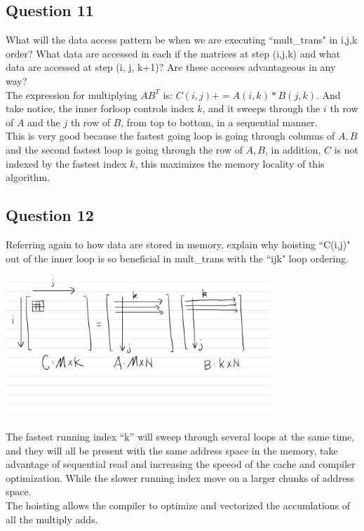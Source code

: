\documentclass[]{article}
\begin{document}
\subsection*{Question 11}
    What will the data access pattern be when we are executing ``mult\_trans" in i,j,k order?  What data are accessed in each if the matrices at step (i,j,k) and what data are accessed at step (i, j, k+1)? Are these accesses advantageous in any way?
    \\[1.1em]
    The expression for multiplying $AB^T$ is: $C(i, j) \mathrel{{+}{=}} A(i, k) * B(j, k)$. And take notice, the inner forloop controls index $k$, and it sweeps through the $i$ th row of $A$ and the $j$ th row of $B$, from top to bottom, in a sequential manner. 
    \\[1.1em]
    This is very good because the fastest going loop is going through columns of $A,B$ and the second fastest loop is going through the row of $A, B$, in addition, $C$ is not indexed by the fastest index $k$, this maximizes the memory locality of this algorithm. 
\subsection*{Question 12}
    Referring again to how data are stored in memory, explain why hoisting  ``C(i,j)" out of the inner loop is so beneficial in mult\_trans with the ``ijk" loop ordering.
    \begin{center}
        \includegraphics[width=10cm]{loop-hoist-illustrate.png}
    \end{center}
    The fastest running index ``k'' will sweep through several loops at the same time, and they will all be present with the same address space in the memory, take advantage of sequential read and increasing the speeod of the cache and compiler optimization. While the slower running index move on a larger chunks of address space. 
    \\[1.1em]
    The hoisting allows the compiler to optimize and vectorized the accumlations of all the multiply adds. 
\end{document}
